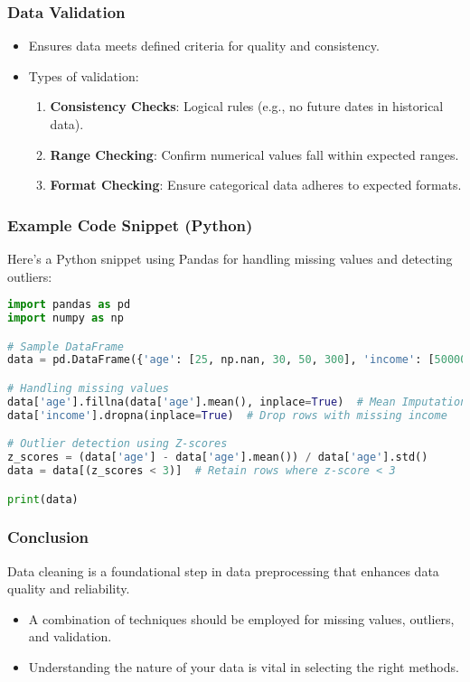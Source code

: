 \documentclass{beamer}
\begin{document}
\begin{frame}[fragile]
    \frametitle{Data Validation}
    \begin{itemize}
        \item Ensures data meets defined criteria for quality and consistency.
        \item Types of validation:
        \begin{enumerate}
            \item \textbf{Consistency Checks}: Logical rules (e.g., no future dates in historical data).
            \item \textbf{Range Checking}: Confirm numerical values fall within expected ranges.
            \item \textbf{Format Checking}: Ensure categorical data adheres to expected formats.
        \end{enumerate}
    \end{itemize}
\end{frame}

\begin{frame}[fragile]
    \frametitle{Example Code Snippet (Python)}
    Here’s a Python snippet using Pandas for handling missing values and detecting outliers:
    \begin{lstlisting}[language=Python]
import pandas as pd
import numpy as np

# Sample DataFrame
data = pd.DataFrame({'age': [25, np.nan, 30, 50, 300], 'income': [50000, 60000, np.nan, 80000, 120000]})

# Handling missing values
data['age'].fillna(data['age'].mean(), inplace=True)  # Mean Imputation
data['income'].dropna(inplace=True)  # Drop rows with missing income

# Outlier detection using Z-scores
z_scores = (data['age'] - data['age'].mean()) / data['age'].std()
data = data[(z_scores < 3)]  # Retain rows where z-score < 3

print(data)
    \end{lstlisting}
\end{frame}

\begin{frame}
    \frametitle{Conclusion}
    Data cleaning is a foundational step in data preprocessing that enhances data quality and reliability. 
    \begin{itemize}
        \item A combination of techniques should be employed for missing values, outliers, and validation.
        \item Understanding the nature of your data is vital in selecting the right methods.
    \end{itemize}
\end{frame}
\end{document}
